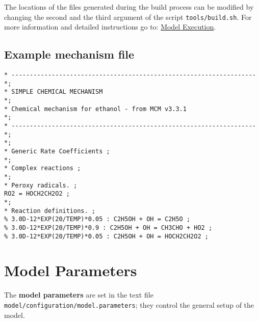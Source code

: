 The locations of the files generated during the build process can be
modified by changing the second and the third argument of the script
\texttt{tools/build.sh}. For more information and detailed
instructions go to: \hyperref[ch:execution]{Model Execution}.

\subsection{Example mechanism
  file} \label{subsec:example-mechanism-file}

\begin{verbatim}
* ------------------------------------------------------------------- *;
* SIMPLE CHEMICAL MECHANISM                                           *;
* Chemical mechanism for ethanol - from MCM v3.3.1                    *;
* ------------------------------------------------------------------- *;
*;
* Generic Rate Coefficients ;
*;
* Complex reactions ;
*;
* Peroxy radicals. ;
RO2 = HOCH2CH2O2 ;
*;
* Reaction definitions. ;
% 3.0D-12*EXP(20/TEMP)*0.05 : C2H5OH + OH = C2H5O ;
% 3.0D-12*EXP(20/TEMP)*0.9 : C2H5OH + OH = CH3CHO + HO2 ;
% 3.0D-12*EXP(20/TEMP)*0.05 : C2H5OH + OH = HOCH2CH2O2 ;
\end{verbatim}

\section{Model Parameters} \label{sec:parameters}

The \textbf{model parameters} are set in the text file
\texttt{model/configuration/model.parameters}; they control the
general setup of the model.

